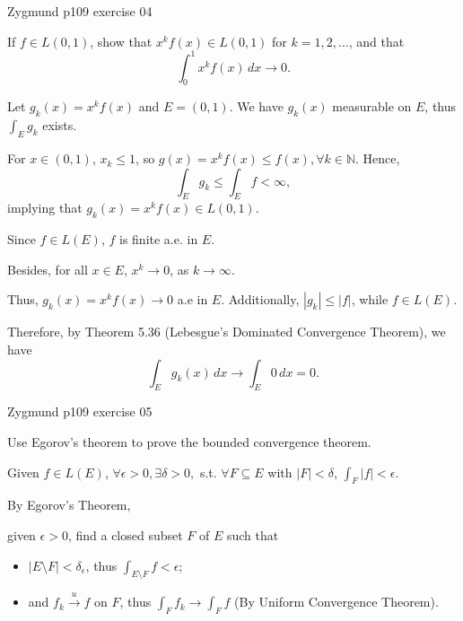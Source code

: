 \documentclass[UTF8,a4paper,10pt]{article}
\begin{document}
\pagebreak

\begin{Problem}[]{Zygmund p109 exercise 04}

  
  If $f \in L(0, 1)$, show that $x^kf(x) \in L(0, 1)$ for $k = 1, 2, \ldots$, and that
\[
\int_{0}^{1} x^kf(x) \,dx \rightarrow 0.
\]

\end{Problem}

Let \(g_k(x)=x^kf(x)\) and \(E = (0,1)\). We have
\(g_k(x)\) measurable on \(E\), thus \(\int_{E} g_k\) exists.

For \( x\in (0,1)\), \(x_k \leq 1\), so \(g(x) = x^kf(x)\leq f(x), \forall k\in \mathbb{N} \).
Hence, 
\[\int_{E}g_k \leq \int_{E}f<\infty,\]
implying that \(g_k(x) = x^kf(x) \in L(0, 1)\). 

\dotfill

Since \(f\in L(E)\), \(f\) is finite a.e. in \(E\).

Besides, for all \(x\in E\), \(x^k\to 0\), as \(k\to\infty\).

Thus, \(g_k(x) = x^k f(x) \to 0\) a.e in \(E\). 
Additionally, \(|g_k| \leq |f|\), while \(f \in L(E)\). 

Therefore, by Theorem 5.36 (Lebesgue's Dominated Convergence Theorem), we have
\[\int_{E} g_k(x) \, dx \to \int_{E} 0 \, dx = 0.\]

\pagebreak

\begin{Problem}[]{Zygmund p109 exercise 05}
  
  Use Egorov's theorem to prove the bounded convergence theorem.

\end{Problem}

\begin{mybox}{}

  Given \(f\in L(E)\), \(\forall \epsilon > 0, \exists  \delta > 0,\) s.t. \(\forall F \subseteq E\) with \(|F|<\delta\), \(\int_{F}|f|<\epsilon\).

\end{mybox}

By Egorov's Theorem, 

given \(\epsilon>0\), find a closed subset \(F\) of \(E\) such that 
\begin{itemize}
  \item \(|E\setminus F|<\delta_\epsilon\), thus \(\int_{E\setminus F} f <\epsilon\);
  \item  and \(f_k\overset{u}{\to}f\) on \(F\), thus \(\int_F f_k \to \int_F f\) (By Uniform Convergence Theorem).
\end{itemize}
\end{document}
